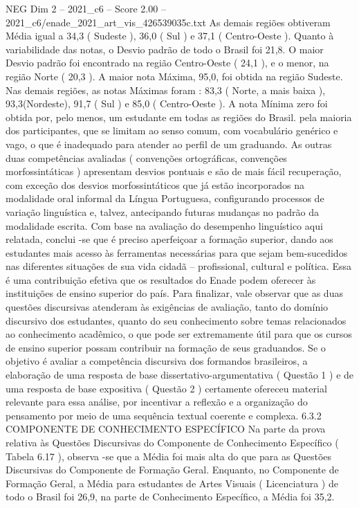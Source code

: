 \begin{textsample}{NEG Dim 2 – 2021\_c6 – Score 2.00 – 2021\_c6/enade\_2021\_art\_vis\_426539035c.txt}
As demais regiões obtiveram Média igual a 34,3 ( Sudeste ), 36,0 ( Sul ) e 37,1 ( Centro-Oeste ).
Quanto à variabilidade das notas, o Desvio padrão de todo o Brasil foi 21,8.
O maior Desvio padrão foi encontrado na região Centro-Oeste ( 24,1 ), e o menor, na região Norte ( 20,3 ).
A maior nota Máxima, 95,0, foi obtida na região Sudeste.
Nas demais regiões, as notas Máximas foram : 83,3 ( Norte, a mais baixa ), 93,3(Nordeste), 91,7 ( Sul ) e 85,0 ( Centro-Oeste ).
A nota Mínima zero foi obtida por, pelo menos, um estudante em todas as regiões do Brasil. pela maioria dos participantes, que se limitam ao senso comum, com vocabulário genérico e vago, o que é inadequado para atender ao perfil de um graduando.
As outras duas competências avaliadas ( convenções ortográficas, convenções morfossintáticas ) apresentam desvios pontuais e são de mais fácil recuperação, com exceção dos desvios morfossintáticos que já estão incorporados na modalidade oral informal da Língua Portuguesa, configurando processos de variação linguística e, talvez, antecipando futuras mudanças no padrão da modalidade escrita.
Com base na avaliação do desempenho linguístico aqui relatada, conclui -se que é preciso aperfeiçoar a formação superior, dando aos estudantes mais acesso às ferramentas necessárias para que sejam bem-sucedidos nas diferentes situações de sua vida cidadã – profissional, cultural e política.
Essa é uma contribuição efetiva que os resultados do Enade podem oferecer às instituições de ensino superior do país.
Para finalizar, vale observar que as duas questões discursivas atenderam às exigências de avaliação, tanto do domínio discursivo dos estudantes, quanto do seu conhecimento sobre temas relacionados ao conhecimento acadêmico, o que pode ser extremamente útil para que os cursos de ensino superior possam contribuir na formação de seus graduandos.
Se o objetivo é avaliar a competência discursiva dos formandos brasileiros, a elaboração de uma resposta de base dissertativo-argumentativa ( Questão 1 ) e de uma resposta de base expositiva ( Questão 2 ) certamente ofereceu material relevante para essa análise, por incentivar a reflexão e a organização do pensamento por meio de uma sequência textual coerente e complexa. 6.3.2 COMPONENTE DE CONHECIMENTO ESPECÍFICO Na parte da prova relativa às Questões Discursivas do Componente de Conhecimento Específico ( Tabela 6.17 ), observa -se que a Média foi mais alta do que para as Questões Discursivas do Componente de Formação Geral.
Enquanto, no Componente de Formação Geral, a Média para estudantes de Artes Visuais ( Licenciatura ) de todo o Brasil foi 26,9, na parte de Conhecimento Específico, a Média foi 35,2.

\end{textsample}
